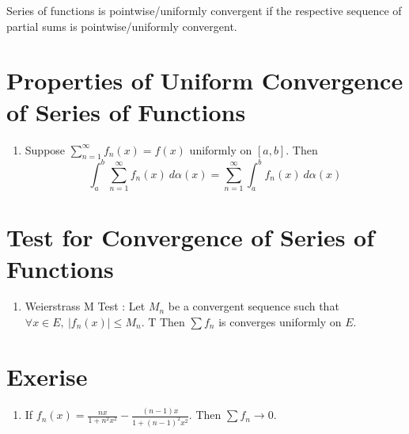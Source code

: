 \begin{definition}
	Series of functions is pointwise/uniformly convergent if the respective sequence of partial sums is pointwise/uniformly convergent.
\end{definition}

\section{Properties of Uniform Convergence of Series of Functions}
\begin{enumerate}
	\item Suppose $\sum_{n=1}^\infty f_n(x) = f(x)$ uniformly on $[a,b]$. Then
	$$\int_a^b \sum_{n=1}^\infty f_n(x)\ d\alpha(x) = \sum_{n=1}^\infty \int_a^b f_n(x)\ d\alpha(x)$$
\end{enumerate}

\section{Test for Convergence of Series of Functions}
\begin{enumerate}
	\item Weierstrass M Test : Let $M_n$ be a convergent sequence such that $\forall x \in E,\ |f_n(x)| \le M_n$. T
	Then $\sum f_n$ is converges uniformly on $E$.
\end{enumerate}

\section{Exerise}
\begin{enumerate}
	\item If $f_n(x) = \frac{nx}{1+n^2x^2} - \frac{(n-1)x}{1+(n-1)^2x^2}$.
	Then $\sum f_n \to 0$.
\end{enumerate}

